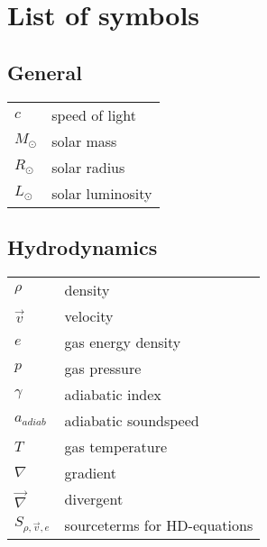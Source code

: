 \chapter*{List of symbols}
\begin{multicols}{2}

\section*{General}
\begin{tabular}{ll}
$c$               & speed of light \\
$M_\odot$         & solar mass  \\
$R_\odot$         & solar radius\\
$L_\odot$         & solar luminosity \\

\end{tabular}

\section*{Hydrodynamics}
\begin{tabular}{ll}
$\rho$         & density       \\
$\vec{v}$      & velocity      \\
$e$		  	   & gas energy density   \\
$p$		  	   & gas pressure  \\
$\gamma$       & adiabatic index \\
$a_{adiab}$    & adiabatic soundspeed \\
$T$		  	   & gas temperature \\
$\nabla$       & gradient\\
$\vec{\nabla}$ & divergent\\
$S_{\rho, \vec{v}, e}$ & sourceterms for HD-equations\\
\end{tabular}



\end{multicols}
